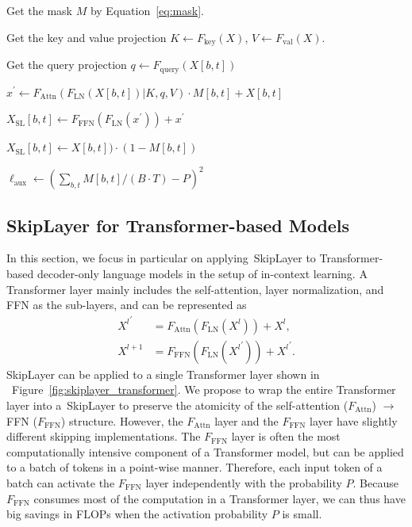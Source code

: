 \documentclass{article}
\newcommand{\skipl}{SkipLayer\xspace}
\begin{document}

\begin{algorithm}[t]
\small
\caption{Forward pass of \skipl}\label{alg:skiplayer_training}
Get the mask $M$ by Equation~\ref{eq:mask}.\;

Get the key and value projection $K\leftarrow F_{\text{key}}(X)$, $V\leftarrow F_{\text{val}}(X)$.

{
{
    Get the query projection $q\leftarrow F_{\text{query}}(X[b, t])$
    
    $x^\prime\leftarrow F_{\text{Attn}}\left(F_{\text{LN}}(X[b, t])|K, q, V\right)\cdot M[b, t] + X[b, t]$
    
    $X_{\text{SL}}[b, t]\leftarrow F_{\text{FFN}}\left(F_{\text{LN}}(x^\prime)\right) + x^\prime$
}
{
    $X_{\text{SL}}[b, t]\leftarrow X[b, t])\cdot (1 - M[b, t])$
}
}
$\ell_{\text{aux}}\leftarrow (\sum_{b,t} M[b, t]/(B\cdot T) - P)^2$

\end{algorithm}

\subsection{SkipLayer for Transformer-based Models}
In this section, we focus in particular on applying~\skipl to Transformer-based decoder-only language models in the setup of in-context learning.
%
A Transformer layer mainly includes the self-attention, layer normalization, and FFN as the sub-layers, and can be represented as
\begin{align}
    {X^l}^\prime &= F_{\text{Attn}}\left(F_{\text{LN}}(X^l)\right) + X^l, \nonumber\\
    X^{l+1} &= F_{\text{FFN}}\left(F_{\text{LN}}({X^l}^\prime)\right) + {X^l}^\prime.
\end{align}
%
\skipl can be applied to a single Transformer layer shown in ~Figure~\ref{fig:skiplayer_transformer}. We propose to wrap the entire Transformer layer into a~\skipl to preserve the atomicity of the self-attention ($F_{\text{Attn}}$) $\to$ FFN ($F_{\text{FFN}}$) structure. However, the $F_{\text{Attn}}$ layer and the $F_{\text{FFN}}$ layer have slightly different skipping implementations. 
%
The $F_{\text{FFN}}$ layer is often the most computationally intensive component of a Transformer model, but can be applied to a batch of tokens in a point-wise manner. Therefore, each input token of a batch can activate the $F_{\text{FFN}}$ layer independently with the probability $P$. Because $F_{\text{FFN}}$ consumes most of the computation in a Transformer layer, we can thus have big savings in FLOPs when the activation probability $P$ is small. 
\end{document}
